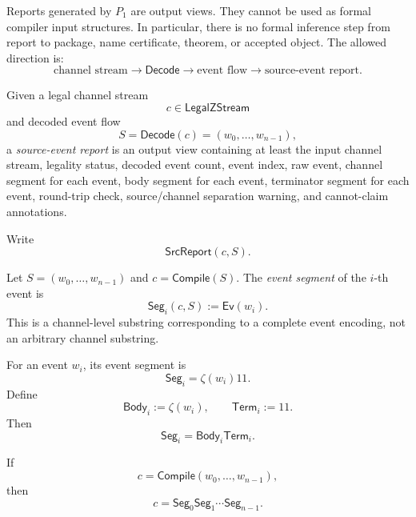 \begin{principle}
\label{prin:source-report-output-not-input}
Reports generated by $P_1$ are output views. They cannot be used as formal compiler input structures. In particular, there is no formal inference step from report to package, name certificate, theorem, or accepted object. The allowed direction is:
$$
  \text{channel stream}
  \longrightarrow
  \mathsf{Decode}
  \longrightarrow
  \text{event flow}
  \longrightarrow
  \text{source-event report}.
$$
\end{principle}

\begin{definition}
\label{def:source-report-source-event-report}
Given a legal channel stream
$$
  c\in\mathsf{LegalZStream}
$$
and decoded event flow
$$
  S=\mathsf{Decode}(c)=(w_0,\ldots,w_{n-1}),
$$
a \emph{source-event report} is an output view containing at least the input channel stream, legality status, decoded event count, event index, raw event, channel segment for each event, body segment for each event, terminator segment for each event, round-trip check, source/channel separation warning, and cannot-claim annotations.

Write
$$
  \mathsf{SrcReport}(c,S).
$$
\end{definition}

\begin{definition}
\label{def:source-report-event-segment}
Let $S=(w_0,\ldots,w_{n-1})$ and $c=\mathsf{Compile}(S)$. The \emph{event segment} of the $i$-th event is
$$
  \mathsf{Seg}_i(c,S):=\mathsf{Ev}(w_i).
$$
This is a channel-level substring corresponding to a complete event encoding, not an arbitrary channel substring.
\end{definition}

\begin{definition}
\label{def:source-report-body-terminator-segment}
For an event $w_i$, its event segment is
$$
  \mathsf{Seg}_i=\zeta(w_i)11.
$$
Define
$$
  \mathsf{Body}_i:=\zeta(w_i),
  \qquad
  \mathsf{Term}_i:=11.
$$
Then
$$
  \mathsf{Seg}_i=\mathsf{Body}_i\mathsf{Term}_i.
$$
\end{definition}

\begin{proposition}
\label{prop:source-report-segments-partition}
If
$$
  c=\mathsf{Compile}(w_0,\ldots,w_{n-1}),
$$
then
$$
  c=\mathsf{Seg}_0\mathsf{Seg}_1\cdots\mathsf{Seg}_{n-1}.
$$
\end{proposition}

